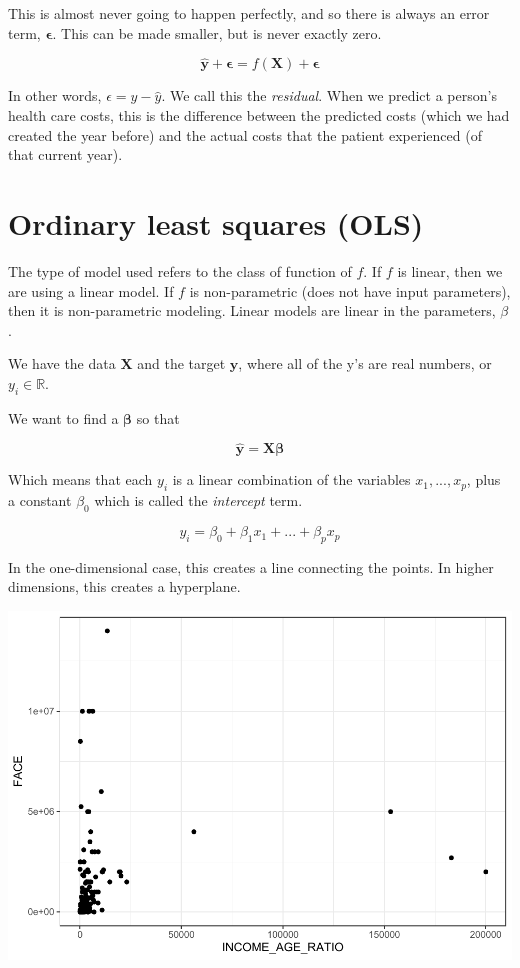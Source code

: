 \documentclass[]{book}
\begin{document}
This is almost never going to happen perfectly, and so there is always an error term, \(\mathbf{\epsilon}\). This can be made smaller, but is never exactly zero.

\[
\mathbf{\hat{y}} + \mathbf{\epsilon} = f(\mathbf{X}) + \mathbf{\epsilon}
\]

In other words, \(\epsilon = y - \hat{y}\). We call this the \emph{residual}. When we predict a person's health care costs, this is the difference between the predicted costs (which we had created the year before) and the actual costs that the patient experienced (of that current year).

\hypertarget{ordinary-least-squares-ols}{%
\section{Ordinary least squares (OLS)}\label{ordinary-least-squares-ols}}

The type of model used refers to the class of function of \(f\). If \(f\) is linear, then we are using a linear model. If \(f\) is non-parametric (does not have input parameters), then it is non-parametric modeling. Linear models are linear in the parameters, \(\beta\).

We have the data \(\mathbf{X}\) and the target \(\mathbf{y}\), where all of the y's are real numbers, or \(y_i \in \mathbb{R}\).

We want to find a \(\mathbf{\beta}\) so that

\[
\mathbf{\hat{y}} = \mathbf{X} \mathbf{\beta}
\]

Which means that each \(y_i\) is a linear combination of the variables \(x_1, ..., x_p\), plus a constant \(\beta_0\) which is called the \emph{intercept} term.

\[
\begin{equation}
y_i = \beta_0 + \beta_1 x_1 + ... + \beta_p x_p
\end{equation}
\]

In the one-dimensional case, this creates a line connecting the points. In higher dimensions, this creates a hyperplane.

\includegraphics{Exam-PA-Study-Manual_files/figure-latex/unnamed-chunk-77-1.pdf}
\end{document}
